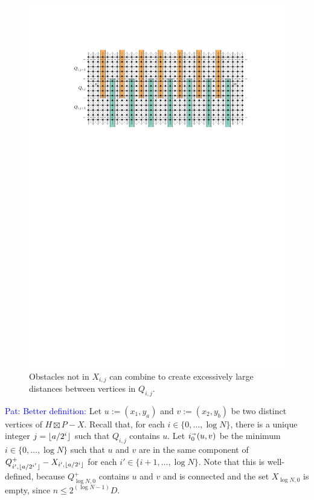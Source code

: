 \documentclass{patmorin}
\renewcommand{\le}{\leqslant}
\newcommand{\pat}[1]{\textcolor{Blue}{Pat: #1}}
\begin{document}
\begin{figure}
  \centering
  \includegraphics{figs/bad_combination}
  \caption{Obstacles not in $X_{i,j}$ can combine to create excessively large distances between vertices in $Q_{i,j}$.}
  \label{big_distance}
\end{figure}




\pat{Better definition: } Let $u:=(x_1,y_a)$ and $v:=(x_2,y_b)$ be two distinct vertices of $H\boxtimes P-X$.  Recall that, for each $i\in\{0,\ldots,\log N\}$, there is a unique integer $j={\lfloor a/2^i \rfloor}$ such that $Q_{i,j}$ contains $u$.  Let $i_0^{\shortrightarrow}(u,v)$ be the minimum $i\in\{0,\ldots,\log N\}$ such that $u$ and $v$ are in the same component of $Q^+_{i',{\lfloor a/2^{i'} \rfloor}}-X_{i',{\lfloor a/2^i \rfloor}}$ for each $i'\in\{i+1,\ldots,\log N\}$.  Note that this is well-defined, because $Q^+_{\log N,0}$ contains $u$ and $v$ and is connected and the set $X_{\log N,0}$ is empty, since $n\le 2^{(\log N-1)} D$.
\end{document}
